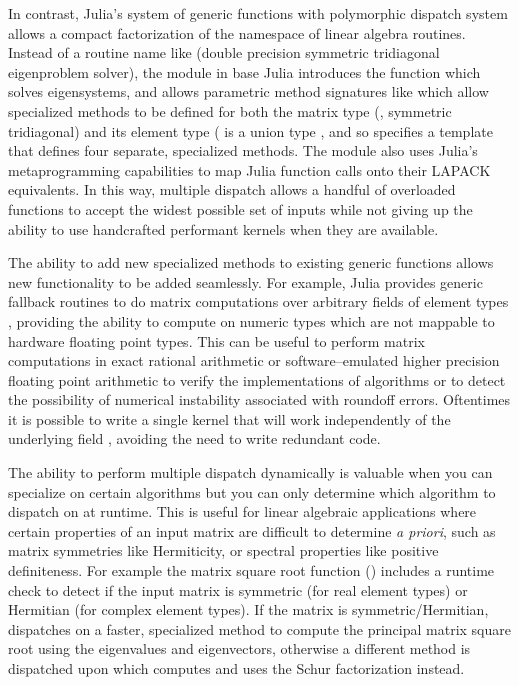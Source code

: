 In contrast, Julia's system of generic functions with polymorphic dispatch
system allows a compact factorization of the namespace of linear algebra
routines. Instead of a routine name like  (double precision
symmetric tridiagonal eigenproblem solver), the  module in base
Julia introduces the function  which solves eigensystems, and allows
parametric method signatures like
 which allow specialized
methods to be defined for both the matrix type (,
symmetric tridiagonal) and its element type ( is a union type
, and so
 specifies a template that defines four separate,
specialized methods. The  module also uses Julia's
metaprogramming capabilities to map Julia function calls onto their LAPACK
equivalents. In this way, multiple dispatch allows a handful of overloaded
functions to accept the widest possible set of inputs while not giving up the
ability to use handcrafted performant kernels when they are available.

The ability to add new specialized methods to existing generic functions allows
new functionality to be added seamlessly. For example, Julia provides generic
fallback routines to do matrix computations over arbitrary fields of element
types , providing the ability to compute on numeric types which are not
mappable to hardware floating point types. This can be useful to perform matrix
computations in exact rational arithmetic or software--emulated higher
precision floating point arithmetic to verify the implementations of algorithms
or to detect the possibility of numerical instability associated with roundoff
errors. Oftentimes it is possible to write a single kernel that will work
independently of the underlying field , avoiding the need to write
redundant code.

The ability to perform multiple dispatch dynamically is valuable when you can
specialize on certain algorithms but you can only determine which algorithm to
dispatch on at runtime. This is useful for linear algebraic applications where
certain properties of an input matrix are difficult to determine \textit{a
priori}, such as matrix symmetries like Hermiticity, or spectral properties
like positive definiteness. For example the matrix square root function
() includes a runtime check to detect if the input matrix is
symmetric (for real element types) or Hermitian (for complex element types). If
the matrix is symmetric/Hermitian,  dispatches on a faster,
specialized method to compute the principal matrix square root using the
eigenvalues and eigenvectors, otherwise a different method is dispatched upon
which computes and uses the Schur factorization instead.

